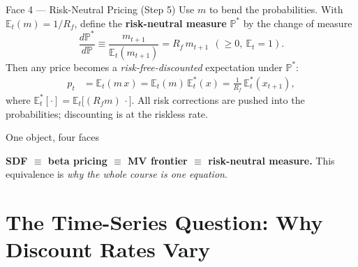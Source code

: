 \documentclass{beamer}
\newcommand{\E}{\mathbb{E}}
\begin{document}
\begin{frame}{Face 4 --- Risk-Neutral Pricing (Step 5)}
\small
Use $m$ to bend the probabilities. With $\E_t(m)=1/R_f$, define the \textbf{risk-neutral measure} $\mathbb{P}^{*}$ by the change of measure
\[
\frac{d\mathbb{P}^{*}}{d\mathbb{P}} \equiv \frac{m_{t+1}}{\E_t(m_{t+1})} = R_f\, m_{t+1}\ \ (\ge 0,\ \E_t=1).
\]
Then any price becomes a \emph{risk-free-discounted} expectation under $\mathbb{P}^{*}$:
\begin{align*}
p_t &= \E_t(m\,x) = \E_t(m)\,\E^{*}_t(x) = \frac{1}{R_f}\,\E^{*}_t(x_{t+1}),
\end{align*}
where $\E^{*}_t[\cdot]=\E_t\!\big[(R_f m)\,\cdot\big]$. \alert{All risk corrections are pushed into the probabilities}; discounting is at the riskless rate.
\begin{block}{One object, four faces}
\centering
{}
\end{block}
\centering\textbf{SDF $\equiv$ beta pricing $\equiv$ MV frontier $\equiv$ risk-neutral measure.} This equivalence is \emph{why the whole course is one equation}.
\end{frame}

\section{The Time-Series Question: Why Discount Rates Vary}
\end{document}
